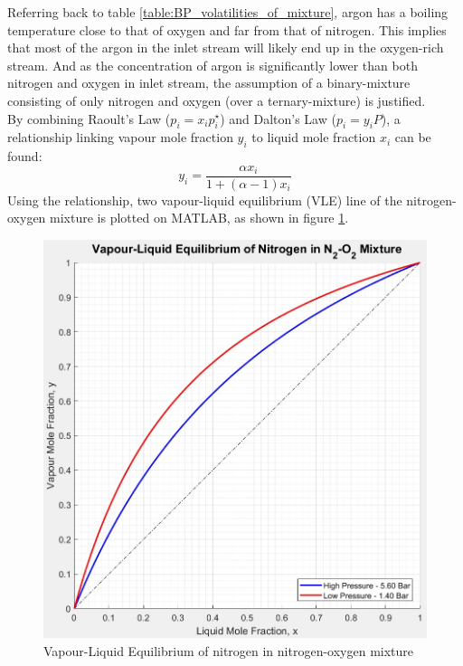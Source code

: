 \documentclass[11pt,oneside]{article}
\begin{document}
        \noindent Referring back to table \ref{table:BP_volatilities_of_mixture}, argon has a boiling temperature close to that of oxygen and far from that of nitrogen. This implies that most of the argon in the inlet stream will likely end up in the oxygen-rich stream. And as the concentration of argon is significantly lower than both nitrogen and oxygen in inlet stream, the assumption of a binary-mixture consisting of only nitrogen and oxygen (over a ternary-mixture) is justified. \\
        By combining Raoult's Law ($p_i = x_ip_i^\star$) and Dalton's Law ($p_i=y_iP$), a relationship linking vapour mole fraction $y_i$ to liquid mole fraction $x_i$ can be found: 
        \begin{equation}
            y_i = \frac{\alpha x_i}{1+(\alpha-1)x_i}
            \label{eq:volatility}
        \end{equation}
        Using the relationship, two vapour-liquid equilibrium (VLE) line of the nitrogen-oxygen mixture is plotted on MATLAB, as shown in figure \ref{VLEdata}. \\
        \begin{figure}[ht]
            \centering
	        \includegraphics[scale=0.5]{VLEdata.jpg}
	        \caption{Vapour-Liquid Equilibrium of nitrogen in nitrogen-oxygen mixture}
	        \label{VLEdata}
        \end{figure}
        
\end{document}
